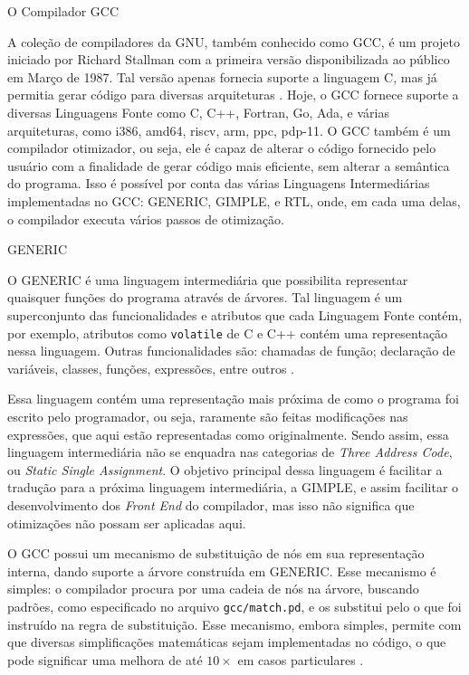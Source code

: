 \begin{section}{O Compilador GCC}

A coleção de compiladores da GNU, também conhecido como GCC, é um projeto
iniciado por Richard Stallman com a primeira versão disponibilizada ao público
em Março de 1987. Tal versão apenas fornecia suporte a linguagem C, mas já permitia
gerar código para diversas arquiteturas \citep{gcc_first_ver}.
Hoje, o GCC fornece suporte a diversas Linguagens Fonte como C, C++, Fortran, Go, Ada,
e várias arquiteturas, como i386, amd64, riscv, arm, ppc, pdp-11. O GCC também
é um compilador otimizador, ou seja, ele é capaz de alterar o código fornecido
pelo usuário com a finalidade de gerar código mais eficiente, sem alterar a semântica do programa. Isso é
possível por conta das várias Linguagens Intermediárias implementadas no
GCC: GENERIC, GIMPLE, e RTL, onde, em cada uma delas, o compilador executa vários
passos de otimização.

\begin{subsection}{GENERIC}

    O GENERIC é uma linguagem intermediária que possibilita representar quaisquer
funções do programa através de árvores. Tal linguagem é um superconjunto
das funcionalidades e atributos que cada Linguagem Fonte contém, por exemplo, atributos
como \texttt{volatile} de C e C++ contém uma representação nessa linguagem.
Outras funcionalidades são: chamadas de função; declaração de variáveis, classes,
funções, expressões, entre outros \citep{generic}.

    Essa linguagem contém uma representação mais próxima de como o programa foi
escrito pelo programador, ou seja, raramente são feitas modificações nas expressões,
que aqui estão representadas como originalmente.
Sendo assim, essa linguagem
intermediária não se enquadra nas categorias de \textit{Three Address Code},
ou \textit{Static Single Assignment}. O objetivo principal dessa linguagem
é facilitar a tradução para a próxima linguagem intermediária, a GIMPLE, e assim
facilitar o desenvolvimento dos \textit{Front End} do compilador, mas isso não
significa que otimizações não possam ser aplicadas aqui.

    O GCC possui um mecanismo de substituição de nós em sua representação
interna, dando suporte a árvore construída em GENERIC. Esse mecanismo é simples: o
compilador procura por uma cadeia de nós na árvore, buscando padrões,
como especificado no arquivo \texttt{gcc/match.pd}, e os substitui pelo o que
foi instruído na regra de substituição. Esse mecanismo, embora simples, permite
com que diversas simplificações matemáticas sejam implementadas no código, o
que pode significar uma melhora de até $10\times$ em casos particulares
\citep{sinatan}.


\end{subsection}
\end{section}
